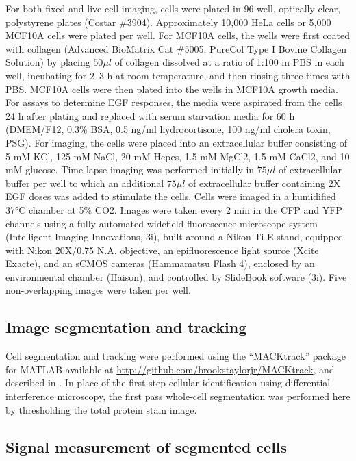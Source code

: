 For both fixed and live‐cell imaging, cells were plated in 96‐well, optically clear, polystyrene plates (Costar \#3904). Approximately 10,000 HeLa cells or 5,000 MCF10A cells were plated per well. For MCF10A cells, the wells were first coated with collagen (Advanced BioMatrix Cat \#5005, PureCol Type I Bovine Collagen Solution) by placing $50 \mu l$ of collagen dissolved at a ratio of 1:100 in PBS in each well, incubating for 2–3 h at room temperature, and then rinsing three times with PBS. MCF10A cells were then plated into the wells in MCF10A growth media. For assays to determine EGF responses, the media were aspirated from the cells 24 h after plating and replaced with serum starvation media for 60 h (DMEM/F12, 0.3\% BSA, 0.5 ng/ml hydrocortisone, 100 ng/ml cholera toxin, PSG). For imaging, the cells were placed into an extracellular buffer consisting of 5 mM KCl, 125 mM NaCl, 20 mM Hepes, 1.5 mM MgCl2, 1.5 mM CaCl2, and 10 mM glucose. Time‐lapse imaging was performed initially in $75 \mu l$ of extracellular buffer per well to which an additional $75 \mu l$ of extracellular buffer containing 2X EGF doses was added to stimulate the cells. Cells were imaged in a humidified 37\si{\degree}C chamber at 5\% CO2. Images were taken every 2 min in the CFP and YFP channels using a fully automated widefield fluorescence microscope system (Intelligent Imaging Innovations, 3i), built around a Nikon Ti‐E stand, equipped with Nikon 20X/0.75 N.A. objective, an epifluorescence light source (Xcite Exacte), and an sCMOS cameras (Hammamatsu Flash 4), enclosed by an environmental chamber (Haison), and controlled by SlideBook software (3i). Five non‐overlapping images were taken per well.

\subsection{Image segmentation and tracking}

Cell segmentation and tracking were performed using the “MACKtrack” package for MATLAB available at \href{http://github.com/brookstaylorjr/MACKtrack}{http://github.com/brookstaylorjr/MACKtrack}, and described in \cite{Selimkhanov2014}. In place of the first‐step cellular identification using differential interference microscopy, the first pass whole‐cell segmentation was performed here by thresholding the total protein stain image.

\subsection{Signal measurement of segmented cells}

